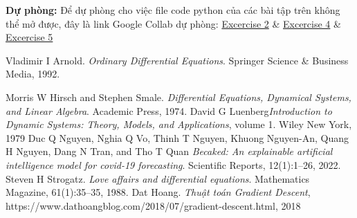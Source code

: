 \documentclass[a4paper]{article}
\begin{document}
\textbf{Dự phòng:} Để dự phòng cho việc file code python của các bài tập trên không thể mở được, đây là link Google Collab dự phòng:
\href{https://drive.google.com/drive/folders/1hVWgUYVexbeCH9ADyVudbC5ZGUV2hFjL?fbclid=IwAR20HoY8ihveweIgeqffKF-8PqHkPHfongm0XEFkxw2uM-Oj549LPzbs0ow}{Excercise 2}
 &
  \href{https://colab.research.google.com/drive/1qCk778N-knNRoCZgXOYjXEwlOY8gml0G#scrollTo=uhqNRhMxNnp3}{Excercise 4}
 & \href{https://colab.research.google.com/drive/1m0rewA-U1Gx6qWTZARUoIuVBGPOEghOZ?fbclid=IwAR2-uZabt8mZ7-FcAazQpRfiNmZ_KHRS_BkDiebGcHR5oiK1Hybkb-wkDyE#scrollTo=_75wYhU5HtCe}{Excercise 5}
\begin{thebibliography}{80}


Vladimir I Arnold. \emph{Ordinary Differential Equations}. Springer Science \& Business Media,
1992.


Morris W Hirsch and Stephen Smale. \emph{Differential Equations, Dynamical Systems, and
Linear Algebra}. Academic Press, 1974.
David G Luenberg\emph{Introduction to Dynamic Systems: Theory, Models, and Applications},
volume 1. Wiley New York, 1979
Duc Q Nguyen, Nghia Q Vo, Thinh T Nguyen, Khuong Nguyen-An, Quang H Nguyen, Dang N Tran, and Tho T Quan \emph{Becaked: An explainable artificial intelligence model for
covid-19 forecasting}. Scientific Reports, 12(1):1–26, 2022.
Steven H Strogatz. \emph{Love affairs and differential equations}. Mathematics Magazine,
61(1):35–35, 1988.
Dat Hoang. \emph{Thuật toán Gradient Descent}, https://www.dathoangblog.com/2018/07/gradient-descent.html, 2018

\end{thebibliography}
\end{document}
